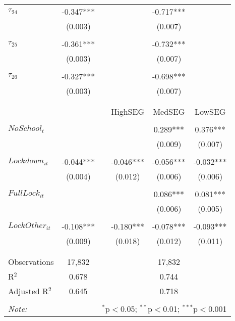 \begin{tabular}{@{\extracolsep{-2pt}}lccccc}
$\tau_{24}$ & -0.347*** &&      & -0.717*** &          \\
            &  (0.003)  &&      &  (0.007)  &          \\
            &           &&      &           &          \\[-2.1ex]
$\tau_{25}$ & -0.361*** &&      & -0.732*** &          \\
            &  (0.003)  &&      &  (0.007)  &          \\
            &           &&      &           &          \\[-2.1ex]
$\tau_{26}$ & -0.327*** &&      & -0.698*** &          \\
            &  (0.003)  &&      &  (0.007)  &          \\
            &           &&      &          &          \\[-2.1ex]
\cline{4-6} \cline{10-12} \\ [-1ex]      
                    &           &&    HighSEG   &   MedSEG   &    LowSEG    \\\\[-.7ex]  
$NoSchool_t$        &           &&           &  0.289*** &  0.376*** \\
                    &           &&           &   (0.009) &   (0.007) \\
                    &           &&           &           &           \\[-2.1ex]
$Lockdown_{it}$     & -0.044*** && -0.046*** & -0.056*** & -0.032*** \\
                    &  (0.004)  &&  (0.012)  &  (0.006)  &  (0.006)  \\
                    &           &&           &           &           \\[-2.1ex]
$FullLock_{it}$     &           &&           &  0.086*** &  0.081*** \\
                    &           &&           &   (0.006) &   (0.005) \\
                    &           &&           &           &           \\[-2.1ex]
$LockOther_{it}$    & -0.108*** && -0.180*** & -0.078*** & -0.093*** \\
                    &  (0.009)  &&  (0.018)  &  (0.012)  &  (0.011)  \\
                    &           &&           &           &           \\[-2.1ex]
\hline \\[-1.8ex] 
Observations     & 17,832 && \multicolumn{3}{c}{17,832}\\ 
R$^{2}$          & 0.678  && \multicolumn{3}{c}{0.744 }\\ 
Adjusted R$^{2}$ & 0.645  && \multicolumn{3}{c}{0.718 }\\ 
\hline 
\hline \\[-1.8ex] 
\textit{Note:}  & \multicolumn{5}{r}{$^{*}$p$<$0.05; $^{**}$p$<$0.01; $^{***}$p$<$0.001} \\ 
\end{tabular} 


% 

